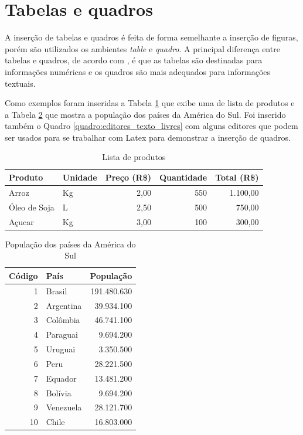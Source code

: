 \section{Tabelas e quadros}
\label{secao:tabelas_e_quadros}

A inserção de tabelas e quadros é feita de forma semelhante a inserção de figuras, porém são utilizados os ambientes \textit{table} e \textit{quadro}. A principal diferença entre tabelas e quadros, de acordo com \citet{ifmg:2020:manual}, é que as tabelas são destinadas para informações numéricas e os quadros são mais adequados para informações textuais.

Como exemplos foram inseridas a Tabela \ref{tabela:lista_produtos} que exibe uma de lista de produtos e a Tabela \ref{tabela:populacao_america_sul} que mostra a população dos países da América do Sul. Foi inserido também o Quadro \ref{quadro:editores_texto_livres} com alguns editores que podem ser usados para se trabalhar com Latex para demonstrar a inserção de quadros.

\begin{table}[!htb]
\caption{Lista de produtos} \label{tabela:lista_produtos}
\begin{tabularx}{\textwidth}{X|l|r|r|r} \hline
Produto      & Unidade & Preço (R\$) & Quantidade & Total (R\$) \\ \hline
Arroz        & Kg      & 2,00        & 550        & 1.100,00    \\
Óleo de Soja & L       & 2,50        & 500        & 750,00      \\
Açucar       & Kg      & 3,00        & 100        & 300,00      \\ \hline
\end{tabularx}
\end{table}

\begin{table}[!htb] \centering
\caption{População dos países da América do Sul} \label{tabela:populacao_america_sul}
\begin{varwidth}{\linewidth}
\begin{tabular}{r|l|r}        \hline
Código  & País            & População   \\ \hline
1       & Brasil          & 191.480.630 \\
2       & Argentina       &  39.934.100 \\
3       & Colômbia        &  46.741.100 \\
4       & Paraguai        &   9.694.200 \\
5       & Uruguai         &   3.350.500 \\
6       & Peru            &  28.221.500 \\
7       & Equador         &  13.481.200 \\
8       & Bolívia         &   9.694.200 \\
9       & Venezuela       &  28.121.700 \\
10      & Chile           &  16.803.000 \\ \hline
\end{tabular}
\end{varwidth}
\end{table}

